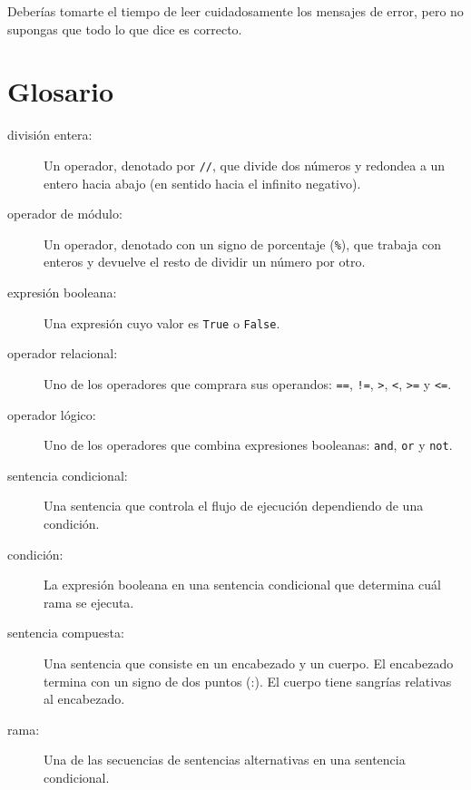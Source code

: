 \documentclass[10pt]{book}
\begin{document}
Deberías tomarte el tiempo de leer cuidadosamente los mensajes de error, pero no
supongas que todo lo que dice es correcto.


\section{Glosario}

\begin{description}

\item[división entera:] Un operador, denotado por {\tt //}, que divide dos
  números y redondea a un entero hacia abajo (en sentido hacia el infinito negativo).

\item[operador de módulo:]  Un operador, denotado con un signo de porcentaje
({\tt \%}), que trabaja con enteros y devuelve el resto de
dividir un número por otro.

\item[expresión booleana:]  Una expresión cuyo valor es
{\tt True} o {\tt False}.

\item[operador relacional:] Uno de los operadores que comprara
sus operandos: {\tt ==}, {\tt !=}, {\tt >}, {\tt <}, {\tt >=} y {\tt <=}.

\item[operador lógico:] Uno de los operadores que combina expresiones
booleanas: {\tt and}, {\tt or} y {\tt not}.

\item[sentencia condicional:]  Una sentencia que controla el flujo de
ejecución dependiendo de una condición.

\item[condición:] La expresión booleana en una sentencia condicional
que determina cuál rama se ejecuta.

\item[sentencia compuesta:]  Una sentencia que consiste en un encabezado
y un cuerpo.  El encabezado termina con un signo de dos puntos (:).  El cuerpo tiene sangrías
relativas al encabezado.

\item[rama:] Una de las secuencias de sentencias alternativas en
una sentencia condicional.


\end{description}
\end{document}
